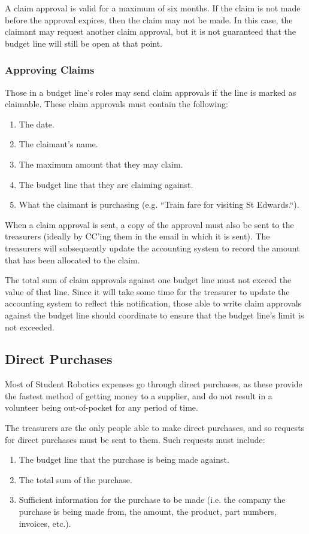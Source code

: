 A claim approval is valid for a maximum of six months.  If the claim is not made before the approval expires, then the claim may not be made.  In this case, the claimant may request another claim approval, but it is not guaranteed that the budget line will still be open at that point.

\subsubsection{Approving Claims}

Those in a budget line's roles may send claim approvals if the line is marked as claimable.  These claim approvals must contain the following:
\begin{enumerate}
\item The date.
\item The claimant's name.
\item The maximum amount that they may claim.
\item The budget line that they are claiming against.
\item What the claimant is purchasing (e.g. ``Train fare for visiting St Edwards.``).
\end{enumerate}

When a claim approval is sent, a copy of the approval must also be sent to the treasurers (ideally by CC'ing them in the email in which it is sent).  The treasurers will subsequently update the accounting system to record the amount that has been allocated to the claim.

The total sum of claim approvals against one budget line must not exceed the value of that line.  Since it will take some time for the treasurer to update the accounting system to reflect this notification, those able to write claim approvals against the budget line should coordinate to ensure that the budget line's limit is not exceeded.

\subsection{Direct Purchases}
Most of Student Robotics expenses go through direct purchases, as these provide the fastest method of getting money to a supplier, and do not result in a volunteer being out-of-pocket for any period of time.

The treasurers are the only people able to make direct purchases, and so requests for direct purchases must be sent to them.  Such requests must include:
\begin{enumerate}
\item The budget line that the purchase is being made against.
\item The total sum of the purchase.
\item Sufficient information for the purchase to be made (i.e. the company the purchase is being made from, the amount, the product, part numbers, invoices, etc.).
\end{enumerate}

